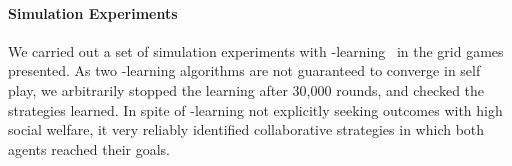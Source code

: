 
\vspace{\up}
\paragraph{Simulation Experiments}
\label{sec:qlearning}

We carried out a set of simulation experiments with \Q-learning~\cite{Watkins92} in
the grid games presented.
%
As two \Q-learning algorithms are not guaranteed to converge in
self play, we arbitrarily stopped the learning after 30,000 rounds,
and checked the strategies learned.  In spite of \Q-learning not
explicitly seeking outcomes with high social welfare, it very reliably
identified collaborative strategies in which both agents reached their goals.

